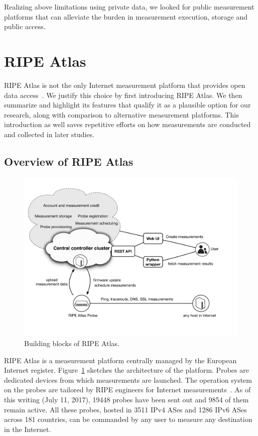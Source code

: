 Realizing above limitations using private data, we looked for public measurement platforms that  can alleviate the burden in measurement execution, storage and public access.

\section{RIPE Atlas}
RIPE Atlas is not the only Internet measurement platform that provides open data access~\cite{Bajpai2015}.
We justify this choice by first introducing RIPE Atlas. 
We then summarize and highlight its features that qualify it as a plausible option for our research, along with comparison to alternative measurement platforms.
This introduction as well saves repetitive efforts on how measurements are conducted and collected in later studies.

\subsection{Overview of RIPE Atlas}
\begin{figure}[!htb]
\centering
\includegraphics[width=\textwidth]{gfx/chap3/ripe_atlas_archi.pdf}
\caption{Building blocks of RIPE Atlas.}
\label{fig:ripe_atlas_archi}
\end{figure}

\acf{RIPE} Atlas is a measurement platform centrally managed by the European Internet register.
Figure~\ref{fig:ripe_atlas_archi} sketches the architecture of the platform.
Probes are dedicated devices from which measurements are launched.
The operation system on the probes are tailored by RIPE engineers for Internet measurements~\cite{firmware}.
As of this writing (July 11, 2017), 19448 probes have been sent out and 9854 of them remain active.
All these probes, hosted in 3511 IPv4 ASes and 1286 IPv6 ASes across 181 countries, can be commanded by any user to measure any destination in the Internet.

